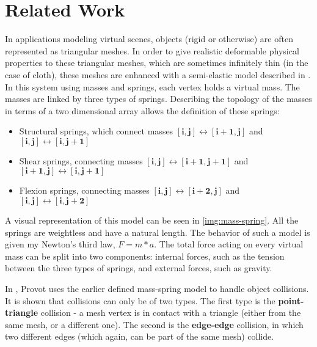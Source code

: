 \section{Related Work}
\label{sec:sota}




In applications modeling virtual scenes, objects (rigid or otherwise) are often represented as triangular meshes. In order to give realistic deformable physical properties to these triangular meshes, which are sometimes infinitely thin (in the case of cloth), these meshes are enhanced with a semi-elastic model described in \citep{provot95}. In this system using masses and springs, each vertex holds a virtual mass. The masses are linked by three types of springs. Describing the topology of the masses in terms of a two dimensional array allows the definition of these springs:

\begin{itemize}
	\item Structural springs, which connect masses $\mathbf{[i, j] \leftrightarrow [i + 1, j]}$ and $\mathbf{[i, j] \leftrightarrow [i,j + 1]}$
	\item Shear springs, connecting masses $\mathbf{[i, j] \leftrightarrow [i + 1, j + 1]}$ and $\mathbf{[i + 1, j] \leftrightarrow [i, j + 1]}$
	\item Flexion springs, connecting masses $\mathbf{[i, j] \leftrightarrow [i + 2, j]}$ and $\mathbf{[i, j] \leftrightarrow [i, j + 2]}$
\end{itemize}

A visual representation of this model can be seen in \autoref{img:mass-spring}. All the springs are weightless and have a natural length. The behavior of such a model is given my Newton's third law, $F = m * a$. The total force acting on every virtual mass can be split into two components: internal forces, such as the tension between the three types of springs, and external forces, such as gravity.


In \citep{provot97}, Provot uses the earlier defined mass-spring model \citep{provot95} to handle object collisions. It is shown that collisions can only be of two types. The first type is the \textbf{point-triangle} collision - a mesh vertex is in contact with a triangle (either from the same mesh, or a different one). The second is the \textbf{edge-edge} collision, in which two different edges (which again, can be part of the same mesh) collide.

